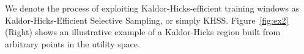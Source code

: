 We denote the process of exploiting Kaldor-Hicks-efficient training windows as
Kaldor-Hicks-Efficient Selective Sampling, or simply KHSS. Figure~\ref{fig:ex2} (Right) shows an illustrative example of a Kaldor-Hicks region built from arbitrary points in the utility space.

%
%
